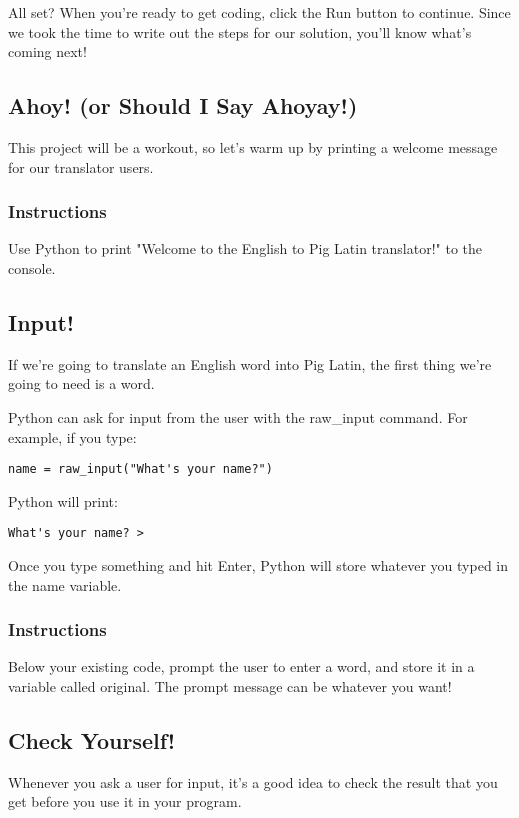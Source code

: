 \documentclass[12pt,a4paper,final,twoside,onecolumn,titlepage]{book}
\begin{document}
All set? When you're ready to get coding, click the Run button to continue. Since we took the time to write out the steps for our solution, you'll know what's coming next!

\subsection{Ahoy! (or Should I Say Ahoyay!)}

This project will be a workout, so let's warm up by printing a welcome message for our translator users.

\subsubsection{Instructions}

Use Python to print "Welcome to the English to Pig Latin translator!" to the console.

\subsection{Input!}

If we're going to translate an English word into Pig Latin, the first thing we're going to need is a word.

Python can ask for input from the user with the raw\_input command. For example, if you type:
\begin{lstlisting}
name = raw_input("What's your name?")
\end{lstlisting}
Python will print:
\begin{lstlisting}
What's your name? >
\end{lstlisting}
Once you type something and hit Enter, Python will store whatever you typed in the name variable.
\subsubsection{Instructions}

Below your existing code, prompt the user to enter a word, and store it in a variable called original. The prompt message can be whatever you want!

\subsection{Check Yourself!}

Whenever you ask a user for input, it's a good idea to check the result that you get before you use it in your program.
\end{document}
